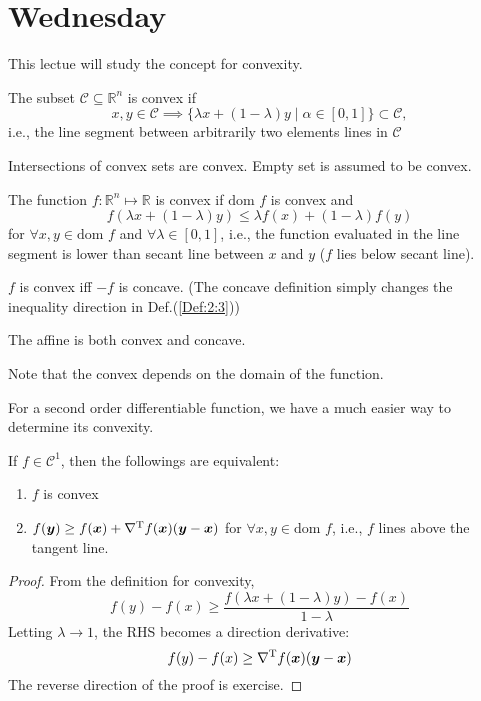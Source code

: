 

\section{Wednesday}
This lectue will study the concept for convexity.

\begin{definition}[Convex]
The subset $\mathcal{C}\subseteq\mathbb{R}^n$ is convex if
\[
x,y\in\mathcal{C}\implies
\{\lambda x + (1-\lambda)y\mid \alpha\in[0,1]\}\subset\mathcal{C},
\]
i.e., the line segment between arbitrarily two elements lines in $\mathcal{C}$
\end{definition}
\begin{remark}
Intersections of convex sets are convex. Empty set is assumed to be convex.
\end{remark}
\begin{definition}[Convex]\label{Def:2:3}
The function $f:\mathbb{R}^n\mapsto\mathbb{R}$ is convex if $\mbox{dom }f$ is convex and
\[
f(\lambda x+ (1-\lambda)y)\le\lambda f(x) + (1-\lambda) f(y)
\]
for $\forall x,y\in\mbox{dom }f$ and $\forall \lambda\in[0,1]$, i.e., the function evaluated in the line segment is lower than secant line between $x$ and $y$ ($f$ lies below secant line).
\end{definition}
\begin{remark}
$f$ is convex iff $-f$ is concave. (The concave definition simply changes the inequality direction in Def.(\ref{Def:2:3}))

The affine is both convex and concave.

Note that the convex depends on the domain of the function.
\end{remark}
For a second order differentiable function, we have a much easier way to determine its convexity.
\begin{theorem}\label{The:2:1}
If $f\in\mathcal{C}^1$, then the followings are equivalent:
\begin{enumerate}
\item
$f$ is convex
\item
$f(\bm y)\ge f(\bm x)+\nabla^{\mathrm T} f(\bm x)(\bm y - \bm x)$ for $\forall x,y\in\mbox{dom }f$, i.e., $f$ lines above the tangent line.
\end{enumerate}
\end{theorem}
\begin{proof}
From the definition for convexity,
\[
f(y) - f(x)\ge\frac{f(\lambda x + (1-\lambda) y) - f(x)}{1 - \lambda}
\]
Letting $\lambda\to1$, the RHS becomes a direction derivative:
\[
f(y) - f(x)\ge\nabla^{\mathrm T} f(\bm x)(\bm y-\bm x)
\]
The reverse direction of the proof is exercise.
\end{proof}
